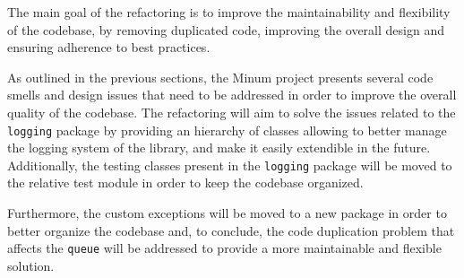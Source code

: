 The main goal of the refactoring is to improve the maintainability and flexibility of the codebase, by removing duplicated code, improving the overall design and ensuring adherence to best practices.

As outlined in the previous sections, the Minum project presents several code smells and design issues that need to be addressed in order to improve the overall quality of the codebase. The refactoring will aim to solve the issues related to the \texttt{logging} package by providing an hierarchy of classes allowing to better manage the logging system of the library, and make it easily extendible in the future. Additionally, the testing classes present in the \texttt{logging} package will be moved to the relative test module in order to keep the codebase organized.

Furthermore, the custom exceptions will be moved to a new package in order to better organize the codebase and, to conclude, the code duplication problem that affects the \texttt{queue} will be addressed to provide a more maintainable and flexible solution.

